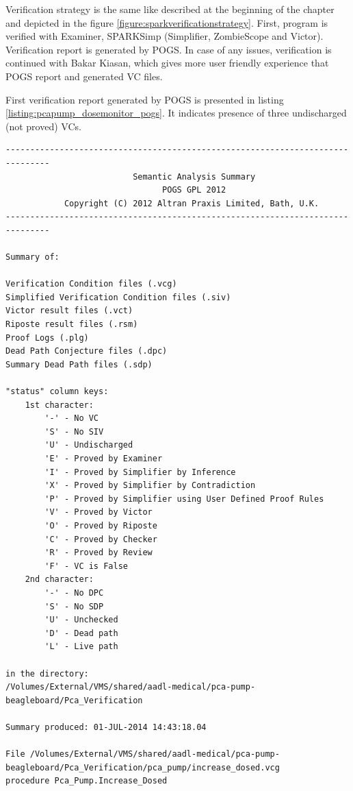 Verification strategy is the same like described at the beginning of the chapter and depicted in the figure \ref{figure:sparkverificationstrategy}. First, program is verified with Examiner, SPARKSimp (Simplifier, ZombieScope and Victor). Verification report is generated by POGS. In case of any issues, verification is continued with Bakar Kiasan, which gives more user friendly experience that POGS report and generated VC files. 

First verification report generated by POGS is presented in listing \ref{listing:pcapump_dosemonitor_pogs}. It indicates presence of three undischarged (not proved) VCs.

\singlespacing
\begin{lstlisting}[frame=single, gobble=0, caption={POGS report}]
-------------------------------------------------------------------------------
                          Semantic Analysis Summary                            
                                POGS GPL 2012                                  
            Copyright (C) 2012 Altran Praxis Limited, Bath, U.K.               
-------------------------------------------------------------------------------

Summary of:

Verification Condition files (.vcg)
Simplified Verification Condition files (.siv)
Victor result files (.vct)
Riposte result files (.rsm)
Proof Logs (.plg)
Dead Path Conjecture files (.dpc)
Summary Dead Path files (.sdp)

"status" column keys:
    1st character:
        '-' - No VC
        'S' - No SIV
        'U' - Undischarged
        'E' - Proved by Examiner
        'I' - Proved by Simplifier by Inference
        'X' - Proved by Simplifier by Contradiction
        'P' - Proved by Simplifier using User Defined Proof Rules
        'V' - Proved by Victor
        'O' - Proved by Riposte
        'C' - Proved by Checker
        'R' - Proved by Review
        'F' - VC is False
    2nd character:
        '-' - No DPC
        'S' - No SDP
        'U' - Unchecked
        'D' - Dead path
        'L' - Live path

in the directory:
/Volumes/External/VMS/shared/aadl-medical/pca-pump-beagleboard/Pca_Verification

Summary produced: 01-JUL-2014 14:43:18.04

File /Volumes/External/VMS/shared/aadl-medical/pca-pump-beagleboard/Pca_Verification/pca_pump/increase_dosed.vcg
procedure Pca_Pump.Increase_Dosed


\end{lstlisting}
